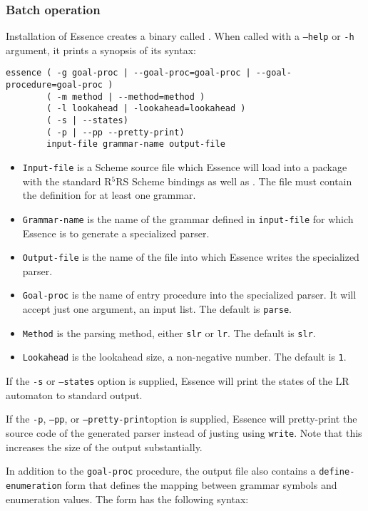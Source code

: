 \documentclass{article}
\newcommand{\codefont}[1]{\texttt{#1}}
\begin{document}
\subsubsection*{Batch operation}
Installation of Essence creates a binary called .
When called with a \codefont{--help} or \codefont{-h} argument, it
prints a synopsis of its syntax:
%
\begin{verbatim}
essence ( -g goal-proc | --goal-proc=goal-proc | --goal-procedure=goal-proc )
        ( -m method | --method=method )
        ( -l lookahead | -lookahead=lookahead )
        ( -s | --states)
        ( -p | --pp --pretty-print)
        input-file grammar-name output-file
\end{verbatim}
%
\begin{itemize}
\item \texttt{Input-file} is a Scheme source file which Essence will
  load into a package with the standard R$^5$RS Scheme bindings as
  well as \link{\codefont{define-grammar}}{form:define-grammar}.  The
  file must contain the definition for at least one grammar.
\item \texttt{Grammar-name} is the name of the grammar defined in
  \texttt{input-file} for which Essence is to generate a specialized
  parser.
\item \texttt{Output-file} is the name of the file into which Essence
  writes the specialized parser.
\item \texttt{Goal-proc} is the name of entry procedure into the
  specialized parser.  It will accept just one argument, an input
  list.  The default is \texttt{parse}.
\item \texttt{Method} is the parsing method, either \texttt{slr} or
  \texttt{lr}.  The default is \texttt{slr}.
\item \texttt{Lookahead} is the lookahead size, a non-negative
  number.  The default is \texttt{1}.
\end{itemize}
%
If the \texttt{-s} or \texttt{--states} option is supplied, Essence
will print the states of the LR automaton to standard output.

If the \texttt{-p}, \texttt{--pp}, or \texttt{--pretty-print}option is
supplied, Essence will pretty-print the source code of the generated
parser instead of justing using \texttt{write}.  Note that this
increases the size of the output substantially.

In addition to the \texttt{goal-proc} procedure, the output file also
contains a \texttt{define-\linebreak[0]enumeration} form that defines the mapping
between grammar symbols and enumeration values.  The form has the
following syntax:
\end{document}
